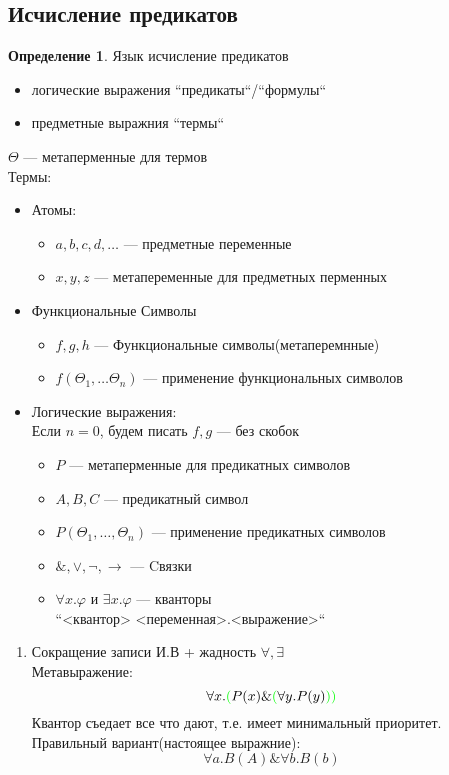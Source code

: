 \documentclass[oneside]{book}
\theoremstyle{plain}
\theoremstyle{remark}
\theoremstyle{definition}
\newtheorem*{definition}{Определение}
\begin{document}
\subsection{Исчисление предикатов}
\label{sec:org1732ebb}
\begin{definition}
Язык исчисление предикатов
\begin{itemize}
\item логические выражения ``предикаты``/``формулы``
\item предметные выражния ``термы``
\end{itemize}
\(\Theta\) --- метаперменные для термов \\
Термы:
\begin{itemize}
\item Атомы:
\begin{itemize}
\item \(a, b, c, d, \dots\) --- предметные переменные
\item \(x, y, z\) --- метапеременные для предметных перменных
\end{itemize}
\item Функциональные Символы
\begin{itemize}
\item \(f, g, h\) --- Функциональные символы(метаперемнные)
\item \(f(\Theta_1, \dots \Theta_n)\) --- применение функциональных символов
\end{itemize}
\item Логические выражения: \\
\color{gray}Если \(n = 0\), будем писать \(f, g\) --- без скобок\color{black}
\begin{itemize}
\item \(P\) --- метаперменные для предикатных символов
\item \(A, B, C\) --- предикатный символ
\item \(P(\Theta_1, \dots, \Theta_n)\) --- применение предикатных символов
\item \(\&, \vee, \neg, \to\) --- Cвязки
\item \(\forall x.\varphi\) и \(\exists x.\varphi\) --- кванторы \\
\color{gray}``<квантор> <переменная>.<выражение>``\color{black} \\
\end{itemize}
\end{itemize}
\end{definition}
\begin{enumerate}
\item Сокращение записи
\label{sec:orgfd74b55}
И.В + жадность \(\forall, \exists\) \\
Метавыражение:
\[ \forall x. \color{green}(\color{black}P(x) \& \color{green}(\color{black}\forall y. P(y) \color{green}))\color{black} \]
Квантор съедает все что дают, т.е. имеет минимальный приоритет. \\
Правильный вариант(настоящее выражние):
\[ \forall a. B(A) \& \forall b. B(b) \]
\end{enumerate}
\end{document}
